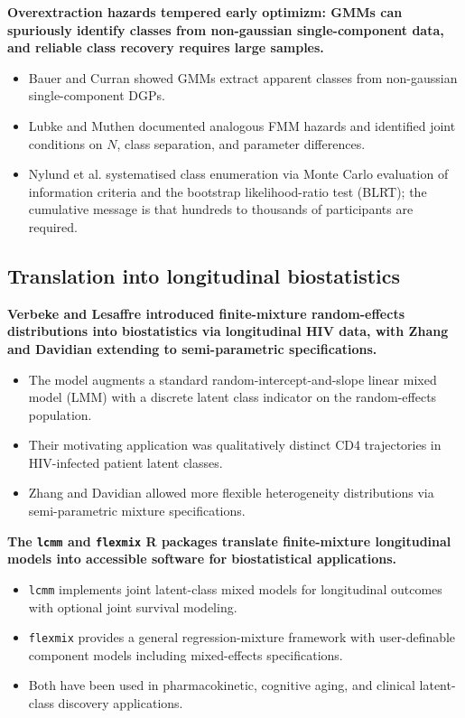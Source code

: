 \documentclass[
  11pt,
]{article}
\begin{document}
\textbf{Overextraction hazards tempered early optimizm: GMMs can
spuriously identify classes from non-gaussian single-component data,
and reliable class recovery requires large samples.}

\begin{itemize}\setlength{\itemsep}{2pt}\setlength{\parskip}{0pt}
\item Bauer and Curran showed GMMs extract apparent classes from
  non-gaussian single-component DGPs.
\item Lubke and Muthen documented analogous FMM hazards and identified
  joint conditions on $N$, class separation, and parameter differences.
\item Nylund et al. systematised class enumeration via Monte Carlo
  evaluation of information criteria and the bootstrap likelihood-ratio
  test (BLRT); the cumulative
  message is that hundreds to thousands of participants are required.
\end{itemize}

\subsection{Translation into longitudinal biostatistics}\label{translation-into-longitudinal-biostatistics}

\textbf{Verbeke and Lesaffre introduced finite-mixture random-effects
distributions into biostatistics via longitudinal HIV data, with Zhang
and Davidian extending to semi-parametric specifications.}

\begin{itemize}\setlength{\itemsep}{2pt}\setlength{\parskip}{0pt}
\item The model augments a standard random-intercept-and-slope linear
  mixed model (LMM)
  with a discrete latent class indicator on the random-effects
  population.
\item Their motivating application was qualitatively distinct CD4
  trajectories in HIV-infected patient latent classes.
\item Zhang and Davidian allowed more flexible heterogeneity
  distributions via semi-parametric mixture specifications.
\end{itemize}

\textbf{The \texttt{lcmm} and \texttt{flexmix} R packages translate
finite-mixture longitudinal models into accessible software for
biostatistical applications.}

\begin{itemize}\setlength{\itemsep}{2pt}\setlength{\parskip}{0pt}
\item \texttt{lcmm} implements joint latent-class mixed models for
  longitudinal outcomes with optional joint survival modeling.
\item \texttt{flexmix} provides a general regression-mixture framework
  with user-definable component models including mixed-effects
  specifications.
\item Both have been used in pharmacokinetic, cognitive aging, and
  clinical latent-class discovery applications.
\end{itemize}
\end{document}
